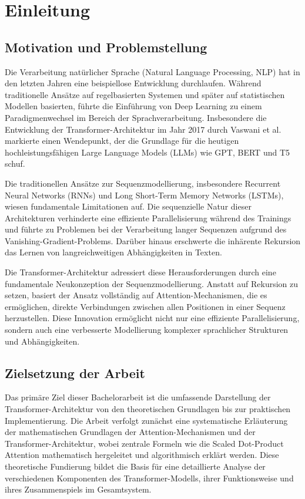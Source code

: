 \chapter{Einleitung}
\label{ch:introduction}

\section{Motivation und Problemstellung}

Die Verarbeitung natürlicher Sprache (Natural Language Processing, NLP) hat in den letzten Jahren eine beispiellose Entwicklung durchlaufen. Während traditionelle Ansätze auf regelbasierten Systemen und später auf statistischen Modellen basierten, führte die Einführung von Deep Learning zu einem Paradigmenwechsel im Bereich der Sprachverarbeitung. Insbesondere die Entwicklung der Transformer-Architektur im Jahr 2017 durch Vaswani et al. \cite{vaswani2017attention} markierte einen Wendepunkt, der die Grundlage für die heutigen hochleistungsfähigen Large Language Models (LLMs) wie GPT, BERT und T5 schuf.

Die traditionellen Ansätze zur Sequenzmodellierung, insbesondere Recurrent Neural Networks (RNNs) und Long Short-Term Memory Networks (LSTMs), wiesen fundamentale Limitationen auf. Die sequenzielle Natur dieser Architekturen verhinderte eine effiziente Parallelisierung während des Trainings und führte zu Problemen bei der Verarbeitung langer Sequenzen aufgrund des Vanishing-Gradient-Problems. Darüber hinaus erschwerte die inhärente Rekursion das Lernen von langreichweitigen Abhängigkeiten in Texten.

Die Transformer-Architektur adressiert diese Herausforderungen durch eine fundamentale Neukonzeption der Sequenzmodellierung. Anstatt auf Rekursion zu setzen, basiert der Ansatz vollständig auf Attention-Mechanismen, die es ermöglichen, direkte Verbindungen zwischen allen Positionen in einer Sequenz herzustellen. Diese Innovation ermöglicht nicht nur eine effiziente Parallelisierung, sondern auch eine verbesserte Modellierung komplexer sprachlicher Strukturen und Abhängigkeiten.

\section{Zielsetzung der Arbeit}

Das primäre Ziel dieser Bachelorarbeit ist die umfassende Darstellung der Transformer-Architektur von den theoretischen Grundlagen bis zur praktischen Implementierung. Die Arbeit verfolgt zunächst eine systematische Erläuterung der mathematischen Grundlagen der Attention-Mechanismen und der Transformer-Architektur, wobei zentrale Formeln wie die Scaled Dot-Product Attention mathematisch hergeleitet und algorithmisch erklärt werden. Diese theoretische Fundierung bildet die Basis für eine detaillierte Analyse der verschiedenen Komponenten des Transformer-Modells, ihrer Funktionsweise und ihres Zusammenspiels im Gesamtsystem.

